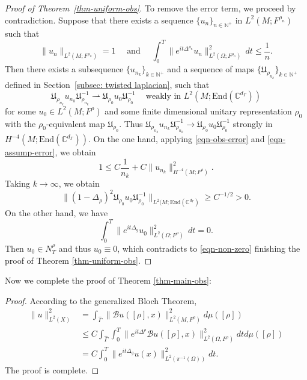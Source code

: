 \documentclass[11pt,oneside,reqno]{amsart}
\theoremstyle{definition}
\numberwithin{equation}{section}
\theoremstyle{plain}
\begin{document}
\begin{proof}[Proof of Theorem~\ref{thm-uniform-obs}]
 To remove the error term, we proceed by contradiction. Suppose that there exists a sequence $\lbrace u_n \rbrace_{n\in\mathbb{N}^+}$ in $L^2(M;F^{\rho_n})$ such that
 \begin{equation}
     \|u_n\|_{L^2(M;F^{\rho_n})}=1 \quad\text{ and }\quad \int_0^T \|e^{it\Delta^{\rho_n}}u_n\|^2_{L^2(\Omega;F^{\rho_n})} \,d t \le \frac{1}{n}.\label{eqn-assump-error}
 \end{equation}
 Then there exists a subsequence $\lbrace u_{n_k}\rbrace_{k\in\mathbb{N}^+}$ and a sequence of maps $\lbrace \mathfrak{U}_{\rho_{n_k}} \rbrace_{k\in \mathbb{N}^+}$ defined in Section~\ref{subsec: twisted laplacian}, such that
 \begin{equation*}
      \mathfrak{U}_{\rho_{n_k}}u_{n_k}\mathfrak{U}_{\rho_{n_k}}^{-1}\rightharpoonup \mathfrak{U}_{\rho_{0}}u_0\mathfrak{U}_{\rho_{0}}^{-1} \ \ \ \ \text{  weakly in } L^2(M;\mathrm{End}(\mathbb{C}^{d_\Gamma}))
 \end{equation*}
 for some $u_0\in L^2(M;F^\rho)$ and some finite dimensional unitary representation $\rho_0$ with the $\rho_0$-equivalent map $\mathfrak{U}_{\rho_{0}}$. Thus $\mathfrak{U}_{\rho_{n_k}}u_{n_k}\mathfrak{U}_{\rho_{n_k}}^{-1}\to \mathfrak{U}_{\rho_{0}}u_0\mathfrak{U}_{\rho_{0}}^{-1}$ strongly in $H^{-4}(M;\mathrm{End}(\mathbb{C}^{d_\Gamma}))$. On the one hand, applying \eqref{eqn-obs-error} and \eqref{eqn-assump-error}, we obtain
 \begin{equation}
     1\le C\frac{1}{n_k}+C\|u_{n_k}\|^2_{H^{-4}(M;F^\rho)}.
 \end{equation}
 Taking $k\to \infty$, we obtain
 \begin{equation}
     \|(1-\Delta_\rho)^{2}\mathfrak{U}_{\rho_{0}}u_0\mathfrak{U}_{\rho_{0}}^{-1}\|_{L^2(M;\mathrm{End}(\mathbb{C}^{d_\Gamma})}\ge C^{-1/2}>0.\label{eqn-non-zero}
 \end{equation}
 On the other hand, we have
 \begin{equation*}
     \int_0^T\|e^{it\Delta_g}u_0\|^2_{L^2(\Omega;F^\rho)}\,d t=0.
 \end{equation*}
 Then $u_0\in N_T^\rho$ and thus $u_0\equiv 0$, which contradicts to \eqref{eqn-non-zero} finishing the proof of Theorem \ref{thm-uniform-obs}.  
\end{proof}
Now we complete the proof of Theorem \ref{thm-main-obs}:
\begin{proof}
According to the generalized Bloch Theorem,
\begin{equation}
\begin{aligned}
\|u\|_{L^2(X)}^2&=\int_{\widehat{\Gamma}}\|\mathcal{B}u([\rho],x)\|^2_{L^2(M,F^\rho)}d\mu([\rho])\\
&\leq C\int_{\widehat{\Gamma}}\int_{0}^{T}\|e^{it\Delta^{\rho}}\mathcal{B}u([\rho],x)\|^2_{L^2(\Omega,F^\rho)}dtd\mu([\rho])\\
&=C\int_{0}^{T}\|e^{it\Delta_g}u(x)\|^2_{L^2(\pi^{-1}(\Omega))}dt.
\end{aligned}
\end{equation}
The proof is complete.
\end{proof}
\end{document}
